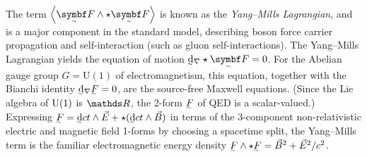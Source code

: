 The term $\angbr{\tsbm F \wedge\star \tsbm F}$ is known as the \emph{Yang--Mills Lagrangian}, and is a major component in the standard model, describing boson force carrier propagation and self-interaction (such as gluon self-interactions).
The Yang--Mills Lagrangian yields the equation of motion $\covdd\star\tsbm F = 0$.
For the Abelian gauge group $G = \mathrm{U}(1)$ of electromagnetism, this equation, together with the Bianchi identity $\covdd\ts F = 0$, are the source-free Maxwell equations.
(Since the Lie algebra of $\mathrm{U}(1)$ is $\RR$, the 2-form $\ts F$ of QED is a scalar-valued.)
Expressing
\begin{math}
	\ts F = \ts\dd ct\wedge\vec E + \star(\ts\dd ct\wedge \vec B)
\end{math}
in terms of the 3-component non-relativistic electric and magnetic field 1-forms by choosing a spacetime split, the Yang--Mills term is the familiar electromagnetic energy density $\ts F \wedge\star \ts F = \vec B^2 + \vec E^2/c^2$.


